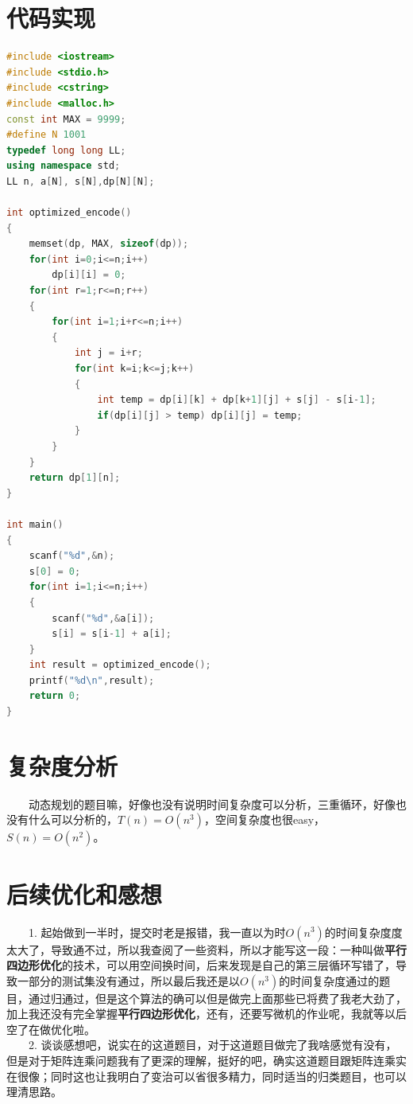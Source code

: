 \documentclass[11pt]{ctexart}
\begin{document}
\section{代码实现}
\begin{lstlisting}[language=C++]
#include <iostream>
#include <stdio.h>
#include <cstring>
#include <malloc.h>
const int MAX = 9999;
#define N 1001
typedef long long LL;
using namespace std;
LL n, a[N], s[N],dp[N][N];

int optimized_encode()
{
    memset(dp, MAX, sizeof(dp));
    for(int i=0;i<=n;i++)
        dp[i][i] = 0;
    for(int r=1;r<=n;r++) 
    {    
        for(int i=1;i+r<=n;i++)
        {
            int j = i+r;         
            for(int k=i;k<=j;k++)
            {
                int temp = dp[i][k] + dp[k+1][j] + s[j] - s[i-1];
                if(dp[i][j] > temp) dp[i][j] = temp;
            }
        }
    }  
    return dp[1][n];
}

int main()
{
    scanf("%d",&n);
    s[0] = 0;
    for(int i=1;i<=n;i++)
    {
        scanf("%d",&a[i]);
        s[i] = s[i-1] + a[i];
    }
    int result = optimized_encode();
    printf("%d\n",result);
    return 0;
}
\end{lstlisting}
\section{复杂度分析}
\noindent　　动态规划的题目嘛，好像也没有说明时间复杂度可以分析，三重循环，好像也没有什么可以分析的，$T(n) = O(n^{3})$，空间复杂度也很easy，$S(n) = O(n^{2})$。

\section{后续优化和感想}
\noindent　　1. 起始做到一半时，提交时老是报错，我一直以为时$O(n^{3})$的时间复杂度度太大了，导致通不过，所以我查阅了一些资料，所以才能写这一段：一种叫做\textbf{平行四边形优化}的技术，可以用空间换时间，后来发现是自己的第三层循环写错了，导致一部分的测试集没有通过，所以最后我还是以$O(n^{3})$的时间复杂度通过的题目，通过归通过，但是这个算法的确可以但是做完上面那些已将费了我老大劲了，加上我还没有完全掌握\textbf{平行四边形优化}，还有，还要写微机的作业呢，我就等以后空了在做优化啦。\\
　　2. 谈谈感想吧，说实在的这道题目，对于这道题目做完了我啥感觉有没有，但是对于矩阵连乘问题我有了更深的理解，挺好的吧，确实这道题目跟矩阵连乘实在很像；同时这也让我明白了变治可以省很多精力，同时适当的归类题目，也可以理清思路。
\end{document}

